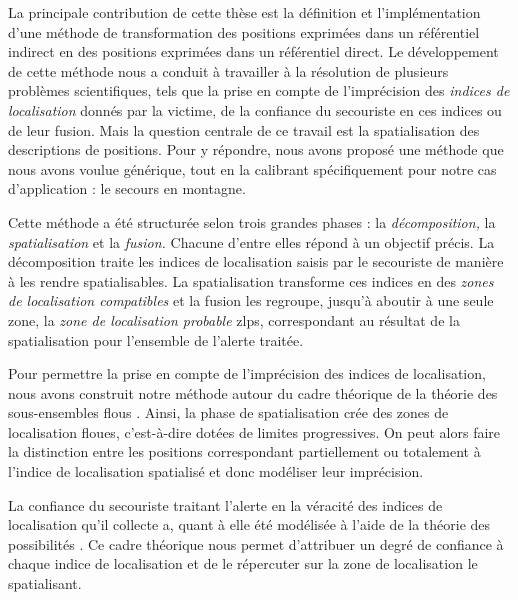 
La principale contribution de cette thèse est la définition et
l'implémentation d'une méthode de transformation des positions
exprimées dans un référentiel indirect en des positions exprimées dans
un référentiel direct. Le développement de cette méthode nous a
conduit à travailler à la résolution de plusieurs problèmes
scientifiques, tels que la prise en compte de l'imprécision des
\emph{indices de localisation} donnés par la victime, de la confiance
du secouriste en ces indices ou de leur fusion. Mais la question
centrale de ce travail est la spatialisation des descriptions de
positions. Pour y répondre, nous avons proposé une méthode que nous
avons voulue générique, tout en la calibrant spécifiquement pour notre
cas d’application : le secours en montagne.

Cette méthode a été structurée selon trois grandes phases : la
\emph{décomposition,} la \emph{spatialisation} et la \emph{fusion.}
Chacune d'entre elles répond à un objectif précis. La décomposition
traite les indices de localisation saisis par le secouriste de manière
à les rendre spatialisables. La spatialisation transforme ces indices
en des \emph{zones de localisation compatibles} et la fusion les
regroupe, jusqu'à aboutir à une seule zone, la \emph{zone de
  localisation probable} \acp{zlp}, correspondant au résultat de la
spatialisation pour l'ensemble de l'alerte traitée.

Pour permettre la prise en compte de l'imprécision des indices de
localisation, nous avons construit notre méthode autour du cadre
théorique de la théorie des sous-ensembles flous
\autocite{Zadeh1965}. Ainsi, la phase de spatialisation crée des zones
de localisation floues, c'est-à-dire dotées de limites
progressives. On peut alors faire la distinction entre les positions
correspondant partiellement ou totalement à l'indice de localisation
spatialisé et donc modéliser leur imprécision. 

La confiance du secouriste traitant l'alerte en la véracité des
indices de localisation qu'il collecte a, quant à elle été modélisée à
l'aide de la théorie des possibilités \autocite{Zadeh1978}. Ce cadre
théorique nous permet d'attribuer un degré de confiance à chaque
indice de localisation et de le répercuter sur la zone de localisation
le spatialisant.

